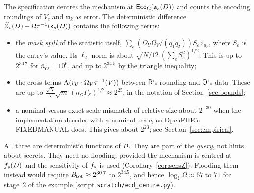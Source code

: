 \begin{remark}\label{rem:centre}
The specification centres the mechanism at $\mathsf{Ecd}_\Omega(\mathbf z_s(D))$ and counts the encoding roundings of $V_e$ and $\mathbf u_k$ as error. The deterministic difference $\widehat Z_s(D)-\Omega\tau^{-1}(\mathbf z_s(D))$ contains the following terms:
\begin{itemize}[nosep]
  \item the \emph{mask spill} of the statistic itself, $\sum_e(\Omega_U\Omega_V/(q_1q_2))S_e\,r_{u_e}$, where $S_e$ is the entry's value. Its $\ell_2$ norm is about $\sqrt{N/12}\,(\sum_eS_e^2)^{1/2}$. This is up to $2^{30.7}$ for $\bar n_O=10^6$, and up to $2^{34.5}$ by the triangle inequality;
  \item the cross terms $\mathrm{A}(r_U\cdot\Omega_V\tau^{-1}(V))$ between $\mathsf{R}$'s rounding and $\mathsf{O}$'s data. These are up to $\tfrac{\sqrt N}{2}\sqrt m\,(\bar n_O\Gamma_{\mathcal E})^{1/2}\approx2^{25}$, in the notation of Section~\ref{sec:bounds};
  \item a nominal-versus-exact scale mismatch of relative size about $2^{-30}$ when the implementation decodes with a nominal scale, as OpenFHE's FIXEDMANUAL does. This gives about $2^{23}$; see Section~\ref{sec:empirical}.
\end{itemize}
All three are deterministic functions of $D$. They are part of the \emph{query}, not hints about secrets. They need no flooding, provided the mechanism is centred at $f_s(D)$ and the sensitivity of $f_s$ is used (Corollary~\ref{cor:sensZ}). Flooding them instead would require $B_{\mathrm{tot}}\approx2^{30.7}$ to $2^{34.5}$, and hence $\log_2\Omega\approx67$ to $71$ for stage~2 of the example (script \texttt{scratch/ecd\_centre.py}).
\end{remark}
